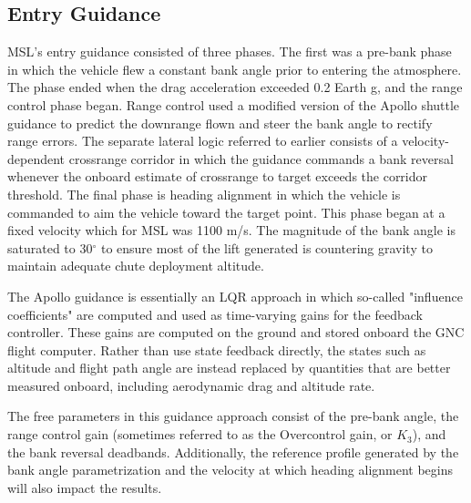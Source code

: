 \documentclass[10pt,a4paper]{article}
\begin{document}
	\subsection{Entry Guidance}
	MSL's entry guidance consisted of three phases. The first was a pre-bank phase in which the vehicle flew a constant bank angle prior to entering the atmosphere. The phase ended when the drag acceleration exceeded 0.2 Earth g, and the range control phase began. Range control used a modified version of the Apollo shuttle guidance to predict the downrange flown and steer the bank angle to rectify range errors. The separate lateral logic referred to earlier consists of a velocity-dependent crossrange corridor in which the guidance commands a bank reversal whenever the onboard estimate of crossrange to target exceeds the corridor threshold. The final phase is heading alignment in which the vehicle is commanded to aim the vehicle toward the target point. This phase began at a fixed velocity which for MSL was 1100 m/s. The magnitude of the bank angle is saturated to 30$^\circ$ to ensure most of the lift generated is countering gravity to maintain adequate chute deployment altitude.
	
	The Apollo guidance is essentially an LQR approach in which so-called "influence coefficients" are computed and used as time-varying gains for the feedback controller. These gains are computed on the ground and stored onboard the GNC flight computer. Rather than use state feedback directly, the states such as altitude and flight path angle are instead replaced by quantities that are better measured onboard, including aerodynamic drag and altitude rate. 
	
	The free parameters in this guidance approach consist of the pre-bank angle, the range control gain (sometimes referred to as the Overcontrol gain, or $ K_3 $), and the bank reversal deadbands. Additionally, the reference profile generated by the bank angle parametrization and the velocity at which heading alignment begins will also impact the results.
		
		
\end{document}
